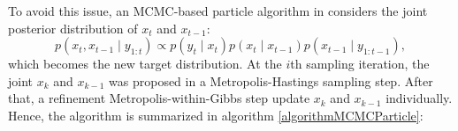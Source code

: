 To avoid this issue, an MCMC-based particle algorithm in \cite{pang2008models} considers the joint posterior distribution of $x_t$ and $x_{t-1}$:
\begin{equation}
p(x_t,x_{t-1}\mid y_{1:t})\propto p(y_t\mid x_t)p(x_t\mid x_{t-1})p(x_{t-1}\mid y_{1:t-1}),
\end{equation}
which becomes the new target distribution. At the $i$th sampling iteration, the joint $x_k$ and $x_{k-1}$ was proposed in a Metropolis-Hastings sampling step. After that, a refinement Metropolis-within-Gibbs step update $x_k$ and $x_{k-1}$ individually. Hence, the algorithm is summarized in algorithm \ref{algorithmMCMCParticle}:
